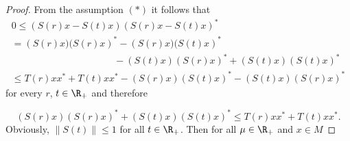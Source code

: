 \begin{proof}
From the assumption $ (*) $ it follows that
\begin{multline*}
	0 	 \leq \left( S(r)x - S(t)x \right) \left( S(r)x - S(t)x \right)^{*} {} \\
		  = \left( S(r)x)(S(r)x \right)^{*} - \left( S(r)x)(S(t)x \right)^{*} \\
		 \phantom{(S(r)x)(S(r)x)^{*}} - (S(t)x)(S(r)x)^{*} + (S(t)x)(S(t)x)^{*}  \\
		\leq T(r)xx^{*} + T(t)xx^{*}   - (S(r)x)(S(t)x)^{*} -  
		   (S(t)x)(S(r)x)^{*}
\end{multline*}
for every $ r $, $ t \in \R_{+} $ and therefore

\[
	(S(r)x)(S(r)x)^{*} + (S(t)x)(S(t)x)^{*} \leq T(r)xx^{*} + T(t)xx^{*} .
\]
Obviously, $ \| S(t)\| \leq 1 $ for all $ t \in \R_{+} $.
Then for all $ \mu \in \R_{+} $ and $ x \in M $


\end{proof}
